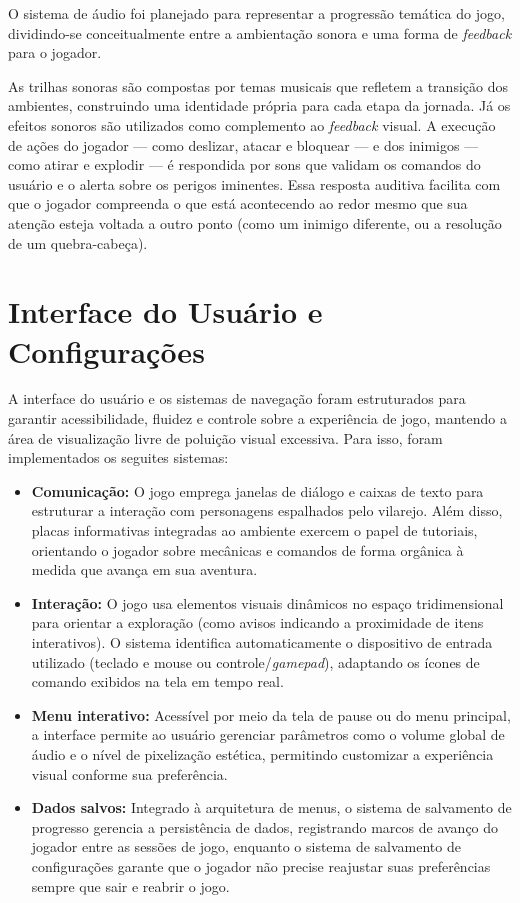 O sistema de áudio foi planejado para representar a progressão temática do jogo, dividindo-se conceitualmente
entre a ambientação sonora e uma forma de \textit{feedback} para o jogador.

As trilhas sonoras são compostas por temas musicais que refletem a transição dos ambientes, %
construindo uma identidade própria para cada etapa da jornada. Já os efeitos sonoros são utilizados
como complemento ao \textit{feedback} visual. A execução de ações do jogador --- como deslizar, atacar e bloquear ---
e dos inimigos --- como atirar e explodir --- é respondida por sons que validam os comandos do usuário e o alerta sobre
os perigos iminentes. Essa resposta auditiva facilita com que o jogador compreenda o que está acontecendo ao redor
mesmo que sua atenção esteja voltada a outro ponto (como um inimigo diferente, ou a resolução de um quebra-cabeça).

\section{Interface do Usuário e Configurações}
\label{sec:interface_e_configuracoes}

A interface do usuário e os sistemas de navegação foram estruturados para
garantir acessibilidade, fluidez e controle sobre a experiência de jogo,
mantendo a área de visualização livre de poluição visual excessiva. Para
isso, foram implementados os seguites sistemas:

\begin{itemize}
	\item \textbf{Comunicação:} O jogo emprega janelas de
	diálogo e caixas de texto para estruturar a interação com personagens
	espalhados pelo vilarejo. Além disso, placas informativas integradas ao
	ambiente exercem o papel de tutoriais, orientando o jogador
	sobre mecânicas e comandos de forma orgânica à medida que avança em sua
	aventura.
	\item \textbf{Interação:} O jogo usa elementos
	visuais dinâmicos no espaço tridimensional para orientar a exploração
	(como avisos indicando a proximidade de itens interativos). O sistema
	identifica automaticamente o dispositivo de entrada utilizado (teclado e
	mouse ou controle/\textit{gamepad}), adaptando os ícones de comando exibidos na
	tela em tempo real.
	\item \textbf{Menu interativo:} Acessível por meio da tela de
	pause ou do menu principal, a interface permite ao usuário gerenciar
	parâmetros como o volume global de áudio e o nível de pixelização
	estética, permitindo customizar a experiência visual conforme sua preferência.
	\item \textbf{Dados salvos:} Integrado à arquitetura de menus, o sistema
	de salvamento de progresso gerencia a persistência de dados, registrando marcos
	de avanço do jogador entre as sessões de jogo, enquanto
	o sistema de salvamento de configurações garante que o jogador não
	precise reajustar suas preferências sempre que sair e reabrir o jogo.
\end{itemize}